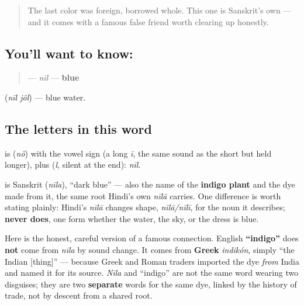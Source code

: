 \label{lesson:BN-C14-nil}



\begin{quote}
The last color was foreign, borrowed whole. This one is Sanskrit's own — and it comes with a famous false friend worth clearing up honestly.
\end{quote}

\subsection*{You'll want to know: }
\begin{quote}
\textbf{} — \emph{nīl} — \textbf{blue}
\end{quote}

  (\emph{nīl jôl}) — blue water.

\subsection*{The letters in this word}
\textbf{} is \textbf{} (\emph{nô}) with the vowel sign \textbf{} (a long \emph{ī}, the same sound as the short \emph{} but held longer), plus \textbf{} (\emph{l}, silent at the end): \emph{nīl}.

\begin{cousinweb}
\textbf{} is Sanskrit \textbf{} (\emph{nīla}), \textquotedblleft{}dark blue\textquotedblright{} — also the name of the \textbf{indigo plant} and the dye made from it, the same root Hindi's own \emph{nīlā} carries. One difference is worth stating plainly: Hindi's \emph{nīlā} changes shape, \emph{nīlā/nīlī}, for the noun it describes; \textbf{ never does}, one form whether the water, the sky, or the dress is blue.

Here is the honest, careful version of a famous connection. English \textbf{\textquotedblleft{}indigo\textquotedblright{}} does \textbf{not} come from \emph{nīla} by sound change. It comes from \textbf{Greek} \emph{indikón}, simply \textquotedblleft{}the Indian {[}thing{]}\textquotedblright{} — because Greek and Roman traders imported the dye \emph{from} India and named it for its source. \emph{Nīla} and \textquotedblleft{}indigo\textquotedblright{} are not the same word wearing two disguises; they are two \textbf{separate} words for the same dye, linked by the history of trade, not by descent from a shared root.
\end{cousinweb}

